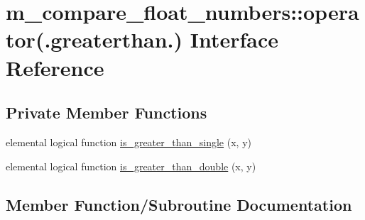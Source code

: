 \hypertarget{interfacem__compare__float__numbers_1_1operator_07_8greaterthan_8_08}{}\section{m\+\_\+compare\+\_\+float\+\_\+numbers\+:\+:operator(.greaterthan.) Interface Reference}
\label{interfacem__compare__float__numbers_1_1operator_07_8greaterthan_8_08}
\subsection*{Private Member Functions}
\begin{DoxyCompactItemize}
\item 
elemental logical function \hyperlink{interfacem__compare__float__numbers_1_1operator_07_8greaterthan_8_08_a74731f139702271cff240069818d8127}{is\+\_\+greater\+\_\+than\+\_\+single} (x, y)
\item 
elemental logical function \hyperlink{interfacem__compare__float__numbers_1_1operator_07_8greaterthan_8_08_a9b0fa7cacc71e80e2b66befb91d45cc2}{is\+\_\+greater\+\_\+than\+\_\+double} (x, y)
\end{DoxyCompactItemize}


\subsection{Member Function/\+Subroutine Documentation}
\mbox{\label{interfacem__compare__float__numbers_1_1operator_07_8greaterthan_8_08_a9b0fa7cacc71e80e2b66befb91d45cc2}} 
